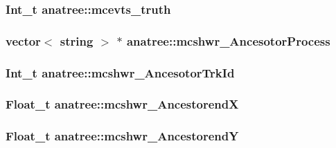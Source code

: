 \hypertarget{classanatree_a6348c95823d70c20e4d6ab3d34dc2de5}{
\subsubsection[{mcevts\-\_\-truth}]{\setlength{\rightskip}{0pt plus 5cm}Int\-\_\-t anatree\-::mcevts\-\_\-truth}}\label{classanatree_a6348c95823d70c20e4d6ab3d34dc2de5}
\hypertarget{classanatree_aa5d90860444fade2049cb26233e1c2d0}{
\subsubsection[{mcshwr\-\_\-\-Ancesotor\-Process}]{\setlength{\rightskip}{0pt plus 5cm}vector$<$ string $>$ $\ast$ anatree\-::mcshwr\-\_\-\-Ancesotor\-Process}}\label{classanatree_aa5d90860444fade2049cb26233e1c2d0}
\hypertarget{classanatree_a2228476d1abad312b8750b73352d0639}{
\subsubsection[{mcshwr\-\_\-\-Ancesotor\-Trk\-Id}]{\setlength{\rightskip}{0pt plus 5cm}Int\-\_\-t anatree\-::mcshwr\-\_\-\-Ancesotor\-Trk\-Id}}\label{classanatree_a2228476d1abad312b8750b73352d0639}
\hypertarget{classanatree_a21f95adb52a06677f22a971e6d7078ab}{
\subsubsection[{mcshwr\-\_\-\-Ancestorend\-X}]{\setlength{\rightskip}{0pt plus 5cm}Float\-\_\-t anatree\-::mcshwr\-\_\-\-Ancestorend\-X}}\label{classanatree_a21f95adb52a06677f22a971e6d7078ab}
\hypertarget{classanatree_a1fc8a0f84f6c07882df62ff65d0985ca}{
\subsubsection[{mcshwr\-\_\-\-Ancestorend\-Y}]{\setlength{\rightskip}{0pt plus 5cm}Float\-\_\-t anatree\-::mcshwr\-\_\-\-Ancestorend\-Y}}\label{classanatree_a1fc8a0f84f6c07882df62ff65d0985ca}
